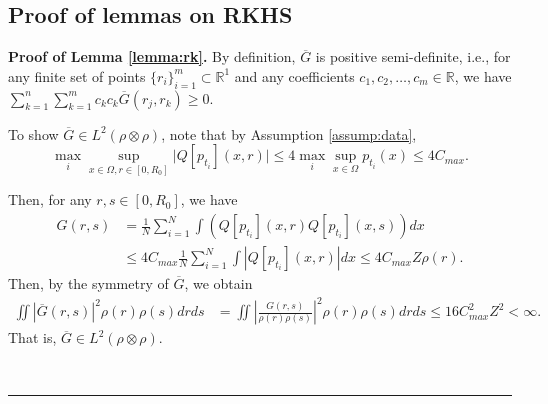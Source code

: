 \documentclass[12pt]{article}
\def\Gbar{ {\overline{G}} }
\newenvironment{proof}[1][Proof]{\noindent\textbf{#1.} }{\ \rule{0.5em}{0.5em}}
\numberwithin{equation}{section}
\numberwithin{theorem}{section}
\begin{document}
\subsection{Proof of lemmas on RKHS}
\begin{proof}[Proof of Lemma \ref{lemma:rk}]
By definition, $\Gbar$ is positive semi-definite, i.e., for any finite set of points $\{r_i\}_{i=1}^m \subset \mathbb{R}^1$ and any coefficients $c_1, c_2, \ldots, c_m \in \mathbb{R}$, we have $\sum_{k=1}^n \sum_{k=1}^m c_k c_k \Gbar\left(r_j, r_k\right) \geqslant 0$.

To show $\Gbar\in L^2(\rho\otimes \rho)$, note that by {\rm Assumption \ref{assump:data}}, 
\[
\max_{i} \sup_{x\in \Omega,r\in [0,R_0]} \big| Q[p_{t_i}](x,r) \big| \leq 4  \max_{i} \sup_{x\in \Omega} p_{t_i}(x) \leq 4 C_{max}.  
\]

Then, for any $r,s\in [0,R_0]$, we have 
\begin{equation}
\begin{aligned}
\label{eq: boundGrs}
G(r, s) & =\frac{1}{N} \sum_{i=1}^N \int \left(Q[p_{t_i}](x, r) Q[p_{t_i}](x, s) \right) d x \\
        & \le 4C_{max}\frac{1}{N}\sum_{i=1}^N \int \left| Q[p_{t_i}](x, r) \right| dx  \le 4 C_{max} Z \rho(r). 
\end{aligned}
\end{equation}
Then, by the symmetry of $\Gbar$, we obtain 
\begin{equation}\label{eq:Gbarint}
\begin{aligned}
\iint|\Gbar(r, s)|^2 \rho(r) \rho(s) d r d s &= \iint \left|\frac{G(r, s)}{\rho(r) \rho(s)}\right|^2 \rho(r) \rho(s) d r d s \leq 16 C_{max}^2 Z^2 < \infty.
\end{aligned}
\end{equation}
That is, $\Gbar\in L^2(\rho\otimes \rho)$. 



\end{proof}
\end{document}
